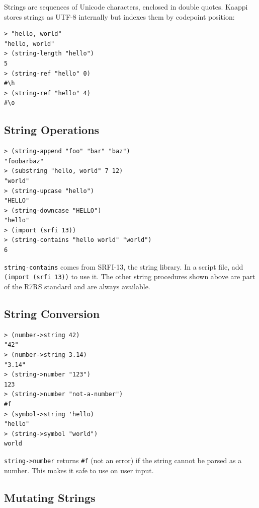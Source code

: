 Strings are sequences of Unicode characters, enclosed in double quotes. Kaappi stores strings as UTF-8 internally but indexes them by codepoint position:

\begin{lstlisting}[style=repl]
> "hello, world"
"hello, world"
> (string-length "hello")
5
> (string-ref "hello" 0)
#\h
> (string-ref "hello" 4)
#\o
\end{lstlisting}

\subsection{String Operations}

\begin{lstlisting}[style=repl]
> (string-append "foo" "bar" "baz")
"foobarbaz"
> (substring "hello, world" 7 12)
"world"
> (string-upcase "hello")
"HELLO"
> (string-downcase "HELLO")
"hello"
> (import (srfi 13))
> (string-contains "hello world" "world")
6
\end{lstlisting}

\begin{note}[SRFI-13]
\texttt{string-contains} comes from SRFI-13, the string library. In a script file, add \texttt{(import (srfi 13))} to use it. The other string procedures shown above are part of the R7RS standard and are always available.
\end{note}

\subsection{String Conversion}

\begin{lstlisting}[style=repl]
> (number->string 42)
"42"
> (number->string 3.14)
"3.14"
> (string->number "123")
123
> (string->number "not-a-number")
#f
> (symbol->string 'hello)
"hello"
> (string->symbol "world")
world
\end{lstlisting}

\texttt{string->number} returns \texttt{\#f} (not an error) if the string cannot be parsed as a number. This makes it safe to use on user input.

\subsection{Mutating Strings}

